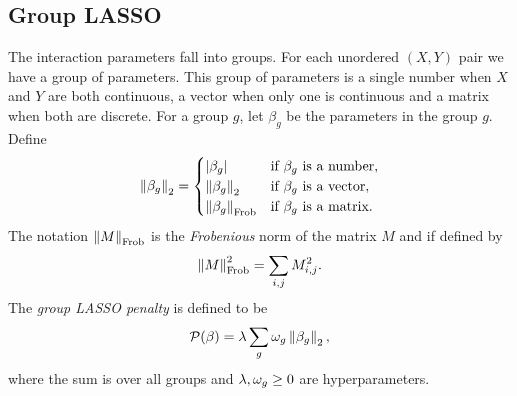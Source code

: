 \subsection{Group LASSO}
The interaction parameters fall into groups. For each unordered $(X,Y)$ pair we have a group of parameters. This group of parameters is a single number when $X$ and $Y$ are both continuous, a vector when only one is continuous and a matrix when both are discrete. For a group $g$, let $\beta_g$ be the parameters in the group $g$. Define 
\[\left\|\beta_g\right\|_2 = \begin{cases}
    {\left\lvert\beta_g\right\rvert} & \text{if $\beta_g$ is a number},\\
    \left\|\beta_g\right\|_2 & \text{if $\beta_g$ is a vector},\\
    \left\|\beta_g\right\|_{\text{Frob}} & \text{if $\beta_g$ is a matrix}.
\end{cases} \] 
The notation $\left\|M\right\|_{\text{Frob}}$ is the \emph{Frobenious} norm of the matrix $M$ and if defined by 
\[\left\|M\right\|_{\text{Frob}}^2 = \sum_{i,j} M_{i,j}^2. \]
The \emph{group LASSO penalty} is defined to be
\[{\mathcal{P}}(\beta) = \lambda\sum_{g} {\omega}_g\left\|\beta_g\right\|_2,  \]
where the sum is over all groups and $\lambda, {\omega}_g\ge 0$ are hyperparameters.
